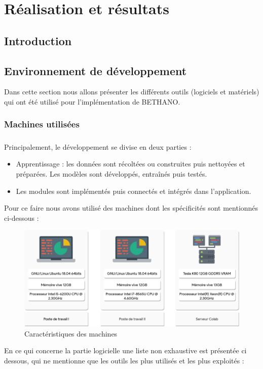 \chapter{Réalisation et résultats}
\section{Introduction}

\section{Environnement de développement}
Dans cette section nous allons présenter les différents outils (logiciels et matériels) qui ont été utilisé pour l'implémentation de BETHANO.
	\subsection{Machines utilisées}
	\paragraph{}
	Principalement, le développement se divise en deux parties : 
	\begin{itemize}
		\item Apprentissage : les données sont récoltées ou construites puis nettoyées et préparées. Les modèles sont développés, entraînés puis testés.
		\item Les modules sont implémentés puis connectés et intégrés dans l'application.
	\end{itemize}
	\par Pour ce faire nous avons utilisé des machines dont les spécificités sont mentionnés ci-dessous :
	\begin{figure}[H] 
		\centering
		\includegraphics[width=0.88\linewidth]{images/implementation/machines.png}
		\caption{Caractéristiques des machines}
		\label{fig:machines}
		
	\end{figure}
	\par
	En ce qui concerne la partie logicielle une liste non exhaustive est présentée ci dessous, qui ne mentionne que les outils les plus utilisés et les plus exploités :
